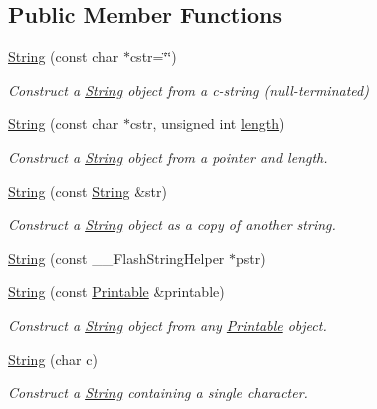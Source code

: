 \subsection*{Public Member Functions}
\begin{DoxyCompactItemize}
\item 
\hyperlink{class_string_a9c6238ddd5e2dca198ead5227fc7b858}{String} (const char $\ast$cstr=\char`\"{}\char`\"{})
\begin{DoxyCompactList}\small\item\em Construct a \hyperlink{class_string}{String} object from a c-\/string (null-\/terminated) \end{DoxyCompactList}\item 
\hyperlink{class_string_a20cfefac6f5b37f40dcb35826b563a5a}{String} (const char $\ast$cstr, unsigned int \hyperlink{class_string_a21691d4bac5ec852977018fef6fb9c8a}{length})
\begin{DoxyCompactList}\small\item\em Construct a \hyperlink{class_string}{String} object from a pointer and length. \end{DoxyCompactList}\item 
\hyperlink{class_string_a5774bcd4a4c232a8aec5a3ec6d01a157}{String} (const \hyperlink{class_string}{String} \&str)
\begin{DoxyCompactList}\small\item\em Construct a \hyperlink{class_string}{String} object as a copy of another string. \end{DoxyCompactList}\item 
\hyperlink{class_string_a8c89c89e3cb69407bf55443c3d9dce0c}{String} (const \+\_\+\+\_\+\+Flash\+String\+Helper $\ast$pstr)
\item 
\hyperlink{class_string_ad61d0ac2a1ff6e81fc7da8097be3c4dd}{String} (const \hyperlink{class_printable}{Printable} \&printable)
\begin{DoxyCompactList}\small\item\em Construct a \hyperlink{class_string}{String} object from any \hyperlink{class_printable}{Printable} object. \end{DoxyCompactList}\item 
\hyperlink{class_string_a1fdfe981d2c5e0075c1669dd94553082}{String} (char c)
\begin{DoxyCompactList}\small\item\em Construct a \hyperlink{class_string}{String} containing a single character. \end{DoxyCompactList}\item 

\end{DoxyCompactItemize}
